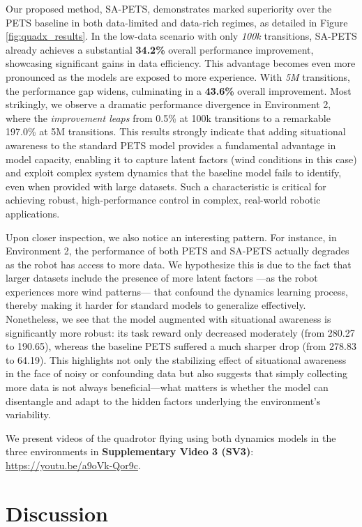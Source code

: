 \documentclass[Afour,sageh,times]{sagej}
\theoremstyle{lemma}
\begin{document}
Our proposed method, SA-PETS, demonstrates marked superiority over the PETS baseline in both data-limited and data-rich regimes, as detailed in Figure \ref{fig:quadx_results}. In the low-data scenario with only \textit{100k} transitions, SA-PETS already achieves a substantial \textbf{34.2\%} overall performance improvement, showcasing significant gains in data efficiency. This advantage becomes even more pronounced as the models are exposed to more experience. With \textit{5M} transitions, the performance gap widens, culminating in a \textbf{43.6\%} overall improvement. Most strikingly, we observe a dramatic performance divergence in Environment 2, where the \textit{improvement leaps} from 0.5\% at 100k transitions to a remarkable 197.0\% at 5M transitions. This results strongly indicate that adding situational awareness to the standard PETS model provides a fundamental advantage in model capacity, enabling it to capture latent factors (wind conditions in this case) and exploit complex system dynamics that the baseline model fails to identify, even when provided with large datasets. Such a characteristic is critical for achieving robust, high-performance control in complex, real-world robotic applications.

Upon closer inspection, we also notice an interesting pattern. For instance, in Environment 2, the performance of both PETS and SA-PETS actually degrades as the robot has access to more data. We hypothesize this is due to the fact that larger datasets include the presence of more latent factors ---as the robot experiences more wind patterns--- that confound the dynamics learning process, thereby making it harder for standard models to generalize effectively. Nonetheless, we see that the model augmented with situational awareness is significantly more robust: its task reward only decreased moderately (from 280.27 to 190.65), whereas the baseline PETS suffered a much sharper drop (from 278.83 to 64.19). This highlights not only the stabilizing effect of situational awareness in the face of noisy or confounding data but also suggests that simply collecting more data is not always beneficial—what matters is whether the model can disentangle and adapt to the hidden factors underlying the environment’s variability.

We present videos of the quadrotor flying using both dynamics models in the three environments in \textbf{Supplementary Video 3 (SV3)}: \url{https://youtu.be/a9oVk-Qor9c}.

\section{Discussion} \label{sec:discussion}
\end{document}
